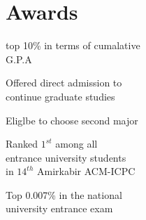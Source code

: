 \documentclass[]{deedy-resume-openfont}
\begin{document}
\begin{minipage}[t]{0.33\textwidth}
\section{Awards}
    \vspace{\topsep} %
\begin{tightemize}
\item top 10\% in terms of cumalative \\ G.P.A
\item Offered direct admission to \\ continue graduate studies
\item Eliglbe to choose second major
\item Ranked $1^{st}$ among all \\ entrance university students \\
    in ${14^{th}}$ Amirkabir ACM-ICPC
\item Top 0.007\% in the national \\university entrance exam
\end{tightemize}

%
%

\end{minipage}
\hfill
\end{document}
